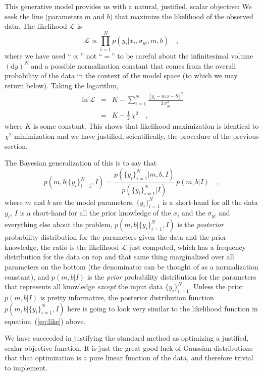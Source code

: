 \documentclass[12pt]{article}
\newcommand{\equationname}{equation}
\newcounter{problem}
\newcommand{\setofall}[3]{\{{#1}\}_{{#2}}^{{#3}}}
\newcommand{\ally}{\setofall{y_i}{i=1}{N}}
\renewcommand{\d}{\mathrm{d}}
\newcommand{\like}{\mathscr{L}}
\begin{document}
This generative model provides us with a natural, justified, scalar
objective: We seek the line (parameters $m$ and $b$) that maximize the
likelihood of the observed data.  The likelihood $\like$ is
\begin{equation}\label{eq:like}
\like \propto \prod_{i=1}^N p(y_i|x_i,\sigma_{yi},m,b) \quad ,
\end{equation}
where we have used ``$\propto$'' not ``$=$'' to be careful about the
infinitesimal volume $(\d y)^N$ and a possible normalization constant
that comes from the overall probability of the data in the context of
the model space (to which we may return below).  Taking the logarithm,
\begin{eqnarray}\displaystyle
\ln\like
 & = & K - \sum_{i=1}^N \frac{[y_i - m\,x - b]^2}{2\,\sigma_{yi}^2} \nonumber\\
 & = & K - \frac{1}{2}\,\chi^2 \quad ,
\end{eqnarray}
where $K$ is some constant.  This shows that likelihood maximization
is identical to $\chi^2$ minimization and we have justified,
scientifically, the procedure of the previous section.

The Bayesian generalization of this is to say that
\begin{equation}
p(m,b|\ally,I) = \frac{p(\ally|m,b,I)}{p(\ally|I)}\,p(m,b|I) \quad ,
\end{equation}
where $m$ and $b$ are the model parameters, $\ally$ is a short-hand
for all the data $y_i$, $I$ is a short-hand for all the prior
knowledge of the $x_i$ and the $\sigma_{yi}$ and everything else about
the problem, $p(m,b|\ally,I)$ is the \emph{posterior} probability
distribution for the parameters given the data and the prior
knowledge, the ratio is the likelihood $\like$ just computed, which
has a frequency distribution for the data on top and that same thing
marginalized over all parameters on the bottom (the denominator can be
thought of as a normalization constant), and $p(m,b|I)$ is the
\emph{prior} probability distribution for the parameters that
represents all knowledge \emph{except} the input data $\ally$.  Unless
the prior $p(m,b|I)$ is pretty informative, the posterior distribution
function $p(m,b|\ally,I)$ here is going to look very similar to the
likelihood function in \equationname~(\ref{eq:like}) above.

We have succeeded in justifying the standard method as optimizing a
justified, scalar objective function.  It is just the great good luck
of Gaussian distributions that that optimization is a pure linear
function of the data, and therefore trivial to implement.
\end{document}
